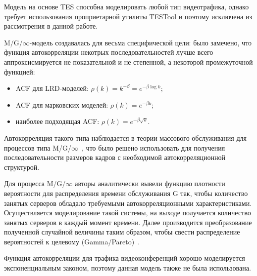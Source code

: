 Модель на основе TES способна моделировать любой тип видеотрафика,
однако требует использования проприетарной утилиты TESTool и поэтому
исключена из рассмотрения в данной работе.

M/G/$\infty$-модель создавалась для весьма специфической цели:
было замечено, что функция автокорреляции некотрых последовательностей
лучше всего аппроксисмируется не показательной и не степенной,
а некоторой промежуточной функцией:

\begin{itemize}
    \item ACF для LRD-моделей: $\rho(k) = k^{-\beta} = e^{-\beta \log k}$;
    \item ACF для марковских моделей: $\rho(k) = e^{-\beta k}$;
    \item наиболее подходящая ACF: $\rho(k) = e^{-\beta \sqrt{k}}$.
\end{itemize}

Автокорреляция такого типа наблюдается в теории массового обслуживания
для процессов типа M/G/$\infty$~\cite{bertsekas}, что было решено использовать для
получения последовательности размеров кадров с необходимой автокорреляционной
структурой.

Для процесса M/G/$\infty$ авторы аналитически вывели функцию плотности
вероятности для распределения времени обслуживания
G так, чтобы количество занятых серверов обладало требуемыми
автокорреляционными характеристиками. Осуществляется
моделирование такой системы, на выходе получается количество
занятых серверов в каждый момент времени.
Далее производится
преобразование полученной случайной величины таким образом,
чтобы свести распределение вероятностей к целевому (Gamma/Pareto)~\cite{mginfty}.

Функция автокорреляции для трафика видеоконференций хорошо моделируется
экспоненциальным законом, поэтому данная модель также не была использована.
